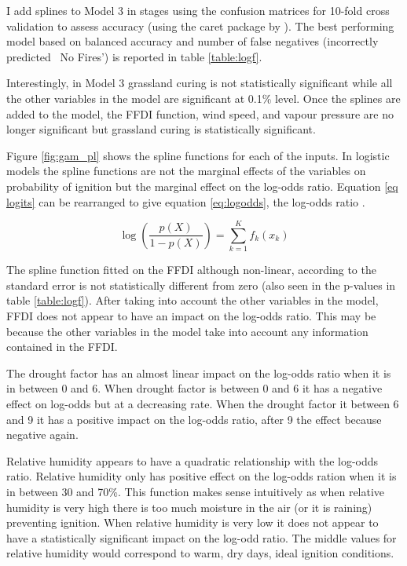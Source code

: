 \documentclass[11pt,a4paper]{article}
\begin{document}
I add splines to Model 3 in stages using the confusion matrices for 10-fold cross validation to assess accuracy (using the caret package by \cite{caret}). The best performing model based on balanced accuracy and number of false negatives (incorrectly predicted ~No Fires') is reported in table \ref{table:logf}. 

Interestingly, in Model 3 grassland curing is not statistically significant while all the other variables in the model are significant at 0.1\% level. Once the splines are added to the model, the FFDI function, wind speed, and vapour pressure are no longer significant but grassland curing is statistically significant. 

Figure \ref{fig:gam_pl} shows the spline functions for each of the inputs. In logistic models the spline functions are not the marginal effects of the variables on probability of ignition but the marginal effect on the log-odds ratio. Equation \ref{eq logits} can be rearranged to give equation \ref{eq:logodds}, the log-odds ratio \citep{james13}. 

\begin{equation}
\label{eq:logodds}
\log(\frac{p(X)}{1-p(X)}) = \sum_{k=1}^{K} f_k (x_k)
\end{equation}

The spline function fitted on the FFDI although non-linear, according to the standard error is not statistically different from zero (also seen in the p-values in table \ref{table:logf}). After taking into account the other variables in the model, FFDI does not appear to have an impact on the log-odds ratio. This may be because the other variables in the model take into account any information contained in the FFDI. 

The drought factor has an almost linear impact on the log-odds ratio when it is in between 0 and 6. When drought factor is between 0 and 6 it has a negative effect on log-odds but at a decreasing rate. When the drought factor it between 6 and 9 it has a positive impact on the log-odds ratio, after 9 the effect because negative again. 

Relative humidity appears to have a quadratic relationship with the log-odds ratio. Relative humidity only has positive effect on the log-odds ration when it is in between 30 and 70\%. This function makes sense intuitively as when relative humidity is very high there is too much moisture in the air (or it is raining) preventing ignition. When relative humidity is very low it does not appear to have a statistically significant impact on the log-odd ratio. The middle values for relative humidity would correspond to warm, dry days, ideal ignition conditions. 
\end{document}
